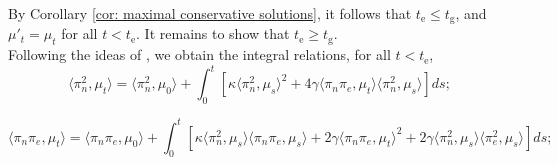 \documentclass[11pt, notitlepage]{article}
\begin{document}
By Corollary \ref{cor: maximal conservative solutions}, it follows that $t_\mathrm{e} \le t_\mathrm{g}$, and $\mu'_t=\mu_t$ for all $t<t_\mathrm{e}$. It remains to show that $t_\mathrm{e}\ge t_\mathrm{g}$. \medskip \\ Following the ideas of \cite[Proposition 2.7]{N00}, we obtain the integral relations, for all $t<t_\mathrm{e}$, \begin{equation} \label{eq: ODE1}
    \langle \pi_n^2, \mu_t\rangle =
    \langle \pi_n^2, \mu_0\rangle + \int_0^t \left[\kappa\langle \pi_n^2, \mu_s\rangle^2+4\gamma\langle \pi_n\pi_e, \mu_t\rangle\langle\pi_n^2, \mu_s\rangle \right] ds;
\end{equation} 

\begin{equation}\label{eq: ODE2}
    \langle \pi_n \pi_e, \mu_t\rangle =
    \langle \pi_n\pi_e, \mu_0\rangle + \int_0^t \left[\kappa\langle \pi_n^2, \mu_s\rangle\langle \pi_n\pi_e, \mu_s\rangle+2\gamma\langle \pi_n\pi_e, \mu_t\rangle^2+2\gamma\langle\pi_n^2, \mu_s\rangle\langle \pi_e^2, \mu_s \rangle \right] ds;
\end{equation}
\end{document}
